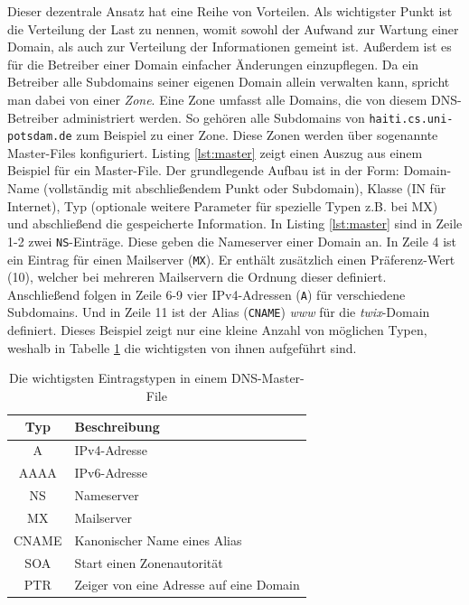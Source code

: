 \documentclass[a4paper, 12pt, BCOR10mm, DIV12, toc=bibliography, toc=listof, german]{scrbook}
\begin{document}
			

			Dieser dezentrale Ansatz hat eine Reihe von Vorteilen. Als wichtigster Punkt ist die
			Verteilung der Last zu nennen, womit sowohl der Aufwand zur Wartung einer Domain, als auch zur
			Verteilung der Informationen gemeint ist. Außerdem ist es für die Betreiber einer Domain
			einfacher Änderungen einzupflegen. Da ein Betreiber alle Subdomains seiner eigenen Domain
			allein verwalten kann, spricht man dabei von einer \textit{Zone}.
			Eine Zone umfasst alle Domains, die von diesem DNS-Betreiber administriert werden. So gehören
			alle Subdomains von \texttt{haiti.cs.uni-potsdam.de} zum Beispiel zu einer Zone. Diese Zonen
			werden über sogenannte Master-Files \cite{rfc1035,liualb2006} konfiguriert. Listing
			\ref{lst:master} zeigt einen Auszug aus einem Beispiel für ein Master-File. Der grundlegende
			Aufbau ist in der Form: Domain-Name (vollständig mit abschließendem Punkt oder Subdomain),
			Klasse (IN für Internet), Typ (optionale weitere Parameter für spezielle Typen z.B. bei MX)
			und abschließend die gespeicherte Information. In Listing \ref{lst:master} sind in Zeile 1-2
			zwei \texttt{NS}-Einträge. Diese geben die Nameserver einer Domain an. In Zeile 4 ist ein Eintrag
			für einen Mailserver (\texttt{MX}). Er enthält zusätzlich einen Präferenz-Wert (10),
			welcher bei mehreren Mailservern die Ordnung dieser definiert. Anschließend folgen in Zeile
			6-9 vier IPv4-Adressen (\texttt{A}) für verschiedene Subdomains. Und in Zeile 11 ist der Alias
			(\texttt{CNAME}) \textit{www} für die  \textit{twix}-Domain definiert. Dieses Beispiel zeigt
			nur eine kleine Anzahl von möglichen Typen, weshalb in Tabelle \ref{tab:dns-types} die
			wichtigsten von ihnen aufgeführt sind.


			\begin{table}
				\centering
				\begin{tabular}{|c|l|}\hline
					Typ & Beschreibung \\\hline\hline
					A	& IPv4-Adresse\\
					AAAA	& IPv6-Adresse\\
					NS	& Nameserver\\
					MX	& Mailserver\\
					CNAME	& Kanonischer Name eines Alias\\
					SOA	& Start einen Zonenautorität\\
					PTR		& Zeiger von eine Adresse auf eine Domain\\\hline
				\end{tabular}
			\caption{Die wichtigsten Eintragstypen in einem DNS-Master-File \cite{rfc1035,rfc3596}}
			\label{tab:dns-types}
			\end{table}
\end{document}
